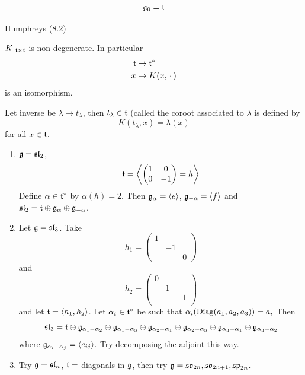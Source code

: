 \documentclass{article}
\begin{document}
\endproof
\begin{fancyprop}{}
    \[\mathfrak{g}_{0}= \mathfrak{t} \]
\end{fancyprop}
\proof Humphreys (8.2) \endproof
\begin{corr}{}
    $K|_{\mathfrak{t} \times \mathfrak{t}}$ is non-degenerate. In particular \begin{align*}
        \mathfrak{t} &\to \mathfrak{t}^{*}\\
        x &\mapsto K(x, \, \cdot \,)
    \end{align*}
    is an isomorphism.
\end{corr}
\proof Let inverse be $\lambda \mapsto t_{\lambda}$, then $t_{\lambda} \in \mathfrak{t}$ (called the coroot associated to $\lambda$ is defined by \[ K(t_{\lambda},x) = \lambda(x)\] for all $x \in \mathfrak{t}$.
\endproof
\begin{exs*} \hspace{0.1cm}
    \begin{enumerate}
        \item $\mathfrak{g} = \mathfrak{sl}_{2}$, \[ \mathfrak{t} = \left\langle \begin{pmatrix}
            1 & 0\\ 
            0 & -1
        \end{pmatrix}=h
        \right\rangle \] Define $\alpha \in \mathfrak{t}^{*}$ by $\alpha(h)=2$. Then $\mathfrak{g}_{\alpha} = \langle e \rangle$, $\mathfrak{g}_{-\alpha}=\langle f \rangle$ and $\mathfrak{sl}_{2} = \mathfrak{t} \oplus \mathfrak{g}_{\alpha} \oplus \mathfrak{g}_{-\alpha}$.
        \item Let $\mathfrak{g} = \mathfrak{sl}_{3}$. Take \[ h_{1} = \begin{pmatrix}
            1 & &\\
            & -1 &\\
            & & 0
        \end{pmatrix}\] and \[ h_{2} = \begin{pmatrix}
            0 & &\\
            & 1 &\\
            & & -1\\
        \end{pmatrix}\] and let $\mathfrak{t} = \langle h_{1}, h_{2} \rangle$. Let $\alpha_{i} \in \mathfrak{t}^{*}$ be such that $\alpha_{i}(\operatorname{Diag}(a_{1},a_{2},a_{3}))=a_{i}$ Then \[ \mathfrak{sl}_{3} = \mathfrak{t} \oplus \mathfrak{g}_{\alpha_{1}-\alpha_{2}} \oplus \mathfrak{g}_{\alpha_{1}-\alpha_{3}} \oplus \mathfrak{g}_{\alpha_{2}-\alpha_{1}} \oplus \mathfrak{g}_{\alpha_{2}-\alpha_{3}} \oplus \mathfrak{g}_{\alpha_{3}-\alpha_{1}} \oplus \mathfrak{g}_{\alpha_{3}-\alpha_{2}}\] where $\mathfrak{g}_{\alpha_{i}-\alpha_{j}} = \langle e_{ij} \rangle.$ Try decomposing the adjoint this way.
        \item Try $\mathfrak{g} = \mathfrak{sl}_{n}$, $\mathfrak{t} = $ diagonals in $\mathfrak{g}$, then try $\mathfrak{g} = \mathfrak{so}_{2n}, \mathfrak{so}_{2n+1},\mathfrak{sp}_{2n}$.
    \end{enumerate}
\end{exs*}
\end{document}
